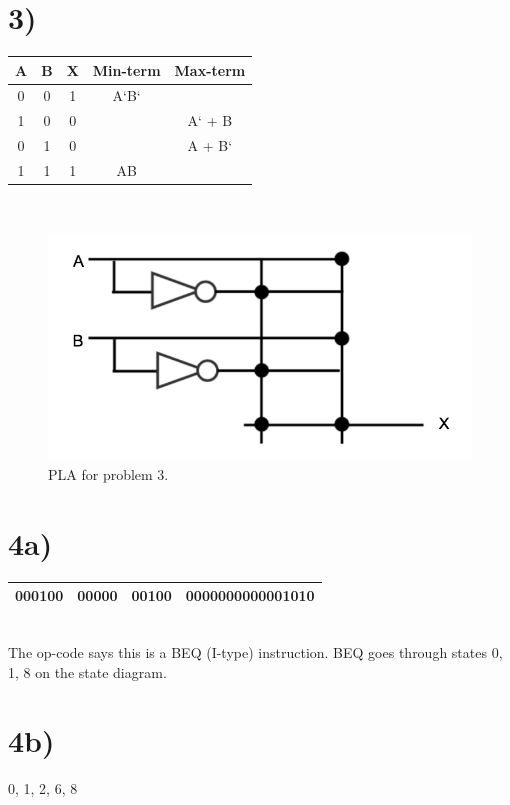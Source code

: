 \documentclass[a4paper,11pt]{article}
\begin{document}

\section*{3)}
\begin{tabular}{| c | c | c | c | c | }
  \hline	
       A & B & X  & Min-term & Max-term \\  \hline
       0 & 0 & 1 & A`B` & \\  \hline
       1 & 0 & 0 & & A` + B\\  \hline
       0 & 1 & 0 & & A + B`\\  \hline
       1 & 1 & 1 & AB & \\  \hline
\end{tabular} \\

\begin{figure}[h]
\caption{PLA for problem 3.}
\centering
\includegraphics[width=.7\textwidth]{problem_3_pla.png}
\end{figure}



\section*{4a)}
\begin{tabular}{| c | c | c | c |}
  \hline	
   000100 & 00000 & 00100 & 0000000000001010 \\  \hline
\end{tabular} \\

The op-code says this is a BEQ (I-type) instruction.  BEQ goes through states 0, 1, 8 on the state diagram.

\section*{4b)}
0, 1, 2, 6, 8
\end{document}
